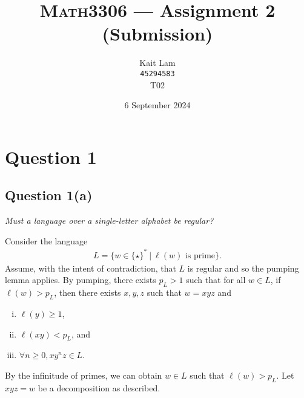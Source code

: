 \documentclass[a4paper]{article}
\author{Kait Lam \\ \small \texttt{45294583} \\ \small {T02}}
\title{\textsc{Math3306} --- Assignment 2 (Submission)}
\date{6 September 2024}
\begin{document}
\maketitle


\section*{Question 1}
\subsection*{Question 1(a)}
\begin{center}
  \textit{Must a language over a single-letter alphabet be regular?}
\end{center}
%
%

\noindent Consider the language
\begin{align*}
   L = \{ w \in \{\star\}^* ~|~ \ell(w)\text{ is prime}\}.
\end{align*}
Assume, with the intent of contradiction, that $L$ is regular and so the pumping lemma applies.
By pumping, there exists $p_L > 1$ such that for all $w \in L$, 
if $\ell(w) > p_L$, then there exists $x, y, z$ such that $w = xyz$ and 
\begin{enumerate}[(i)]
  \setlength{\itemsep}{0pt}
  \item $\ell(y) \ge 1$,
  \item $\ell(xy)  < p_L$, and
  \item $\forall n \ge 0, xy^nz \in L$.
\end{enumerate}
By the infinitude of primes, we can obtain
$w \in L$ such that $\ell(w) > p_L$.
Let $xyz=w$ be a decomposition as described.
\end{document}
